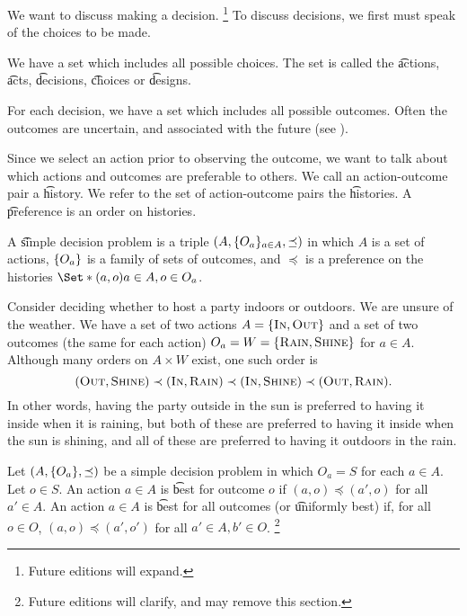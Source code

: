 

We want to discuss making a decision.
  \ifhmode\unskip\fi\footnote{
Future editions will expand.
  }
To discuss decisions, we first must speak of the choices to be made.


We have a set which includes all possible choices.
The set is called the \t{actions}, \t{acts}, \t{decisions}, \t{choices} or \t{designs}.

For each decision, we have a set which includes all possible outcomes.
Often the outcomes are uncertain, and associated with the future (see ).

Since we select an action prior to observing the outcome, we want to talk about which actions and outcomes are preferable to others.
We call an action-outcome pair a \t{history}.
We refer to the set of action-outcome pairs the \t{histories}.
A \t{preference} is an order on histories.

A \t{simple decision problem} is a triple $(A, \{O_a\}_{a \in A}, \preceq)$ in which $A$ is a set of actions, $\{O_a\}$ is a family of sets of outcomes, and $\preceq$ is a preference on the histories $\Set*{(a, o)}{a \in A, o \in O_a}$.



Consider deciding whether to host a party indoors or outdoors.
We are unsure of the weather.
We have a set of two actions $A = \{\textsc{In}, \textsc{Out}\}$ and a set of two outcomes (the same for each action) $O_a = W = \{\textsc{Rain}, \textsc{Shine}\}$ for $a \in A$.
Although many orders on $A \times W$ exist, one such order is
  \[
(\textsc{Out}, \textsc{Shine}) \prec (\textsc{In}, \textsc{Rain}) \prec (\textsc{In}, \textsc{Shine}) \prec (\textsc{Out}, \textsc{Rain}).
  \]
In other words, having the party outside in the sun is preferred to having it inside when it is raining, but both of these are preferred to having it inside when the sun is shining, and all of these are preferred to having it outdoors in the rain.


Let $(A, \{O_a\}, \preceq)$ be a simple decision problem in which $O_a = S$ for each $a \in A$.
Let $o \in S$.
An action $a \in A$ is \t{best for outcome $o$} if $(a, o) \preceq (a', o)$ for all $a' \in A$.
An action $a \in A$ is \t{best for all outcomes} (or \t{uniformly best}) if, for all $o \in O$, $(a, o) \preceq (a', o')$ for all $a' \in A, b' \in O$.
  \ifhmode\unskip\fi\footnote{
Future editions will clarify, and may remove this section.
  }

